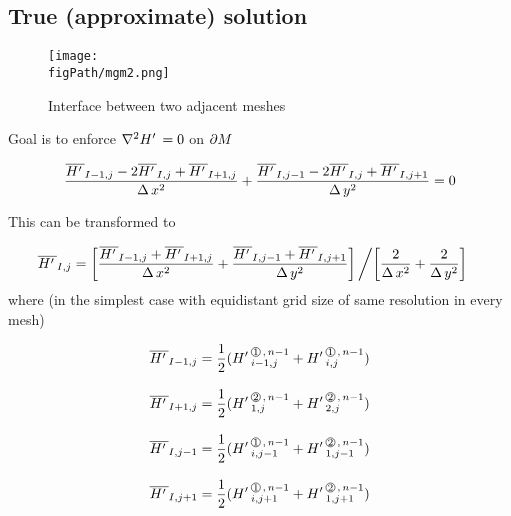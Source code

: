 \subsection{True (approximate) solution}

\begin{figure}[H]
\begin{center}
\texttt{[image: \\figPath/mgm2.png]}
\end{center}
\caption{Interface between two adjacent meshes}
\label{FIG_InterfaceTwo}
\end{figure}

Goal is to enforce $\nabla^2 {H'\,} = 0$ on $\partial M$

\[ \frac{\overline{{H'\,}}_{I-1,j} - 2 \overline{{H'\,}}_{I,j} + \overline{{H'\,}}_{I+1,j}}{\Delta \, x^2}  +  \frac{\overline{{H'\,}}_{I,j-1} - 2 \overline{{H'\,}}_{I,j} + \overline{{H'\,}}_{I,j+1}}{\Delta \, y^2} = 0\]

\noindent This can be transformed to


\begin{align}  
\overline{{H'\,}}_{I,j} &=  \left[\frac{\overline{{H'\,}}_{I-1,j} + \overline{{H'\,}}_{I+1,j}}{\Delta \, x^2}  +  \frac{\overline{{H'\,}}_{I,j-1}  + \overline{{H'\,}}_{I,j+1}}{\Delta \, y^2}\right] \biggl/ \left[\frac{2 }{\Delta \, x^2}  +  \frac{2 }{\Delta \, y^2}\right] \nonumber  
\end{align}
\noindent where (in the simplest case with equidistant grid size of same resolution in every mesh)

\begin{align}  
\HBO{I-1,j}  &= \frac{1}{2} (\HL{i-1,j}{1}{n-1} + \HL{i,j}{1}{n-1})  \nonumber \\[2ex]
\HBO{I+1,j} &= \frac{1}{2} (\HL{1,j}{2}{n-1} + \HL{2,j}{2}{n-1}) \nonumber \\[2ex]
\HBO{I,j-1} &= \frac{1}{2} (\HL{i,j-1}{1}{n-1} + \HL{1,j-1}{2}{n-1}) \nonumber \\[2ex]
\HBO{I,j+1} &= \frac{1}{2} (\HL{i,j+1}{1}{n-1} + \HL{1,j+1}{2}{n-1}) \label{EQ_HB_VALUES}
\end{align}  


